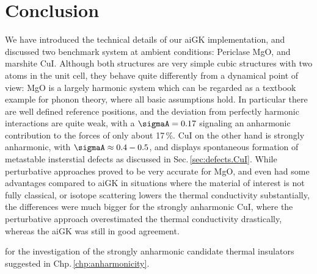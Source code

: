\section{Conclusion}
We have introduced the technical details of our aiGK implementation, and discussed two benchmark system at ambient conditions: Periclase MgO, and marshite CuI. Although both structures are very simple cubic structures with two atoms in the unit cell, they behave quite differently from a dynamical point of view: MgO is a largely harmonic system which can be regarded as a textbook example for phonon theory, where all basic assumptions hold. In particular there are well defined reference positions, and the deviation from perfectly harmonic interactions are quite weak, with a $\sigmaA = 0.17$ signaling an anharmonic contribution to the forces of only about 17\,\%. CuI on the other hand is strongly anharmonic, with $\sigmaA \approx 0.4-0.5$, and displays spontaneous formation of metastable insterstial defects as discussed in Sec.\,\ref{sec:defects.CuI}. 
While perturbative approaches proved to be very accurate for MgO, and even had some advantages compared to aiGK in situations where the material of interest is not fully classical, or isotope scattering lowers the thermal conductivity substantially, the differences were much bigger for the strongly anharmonic CuI, where the perturbative approach overestimated the thermal conductivity drastically, whereas the aiGK was still in good agreement.

 for the investigation of the strongly anharmonic candidate thermal insulators suggested in Chp.\,\ref{chp:anharmonicity}.